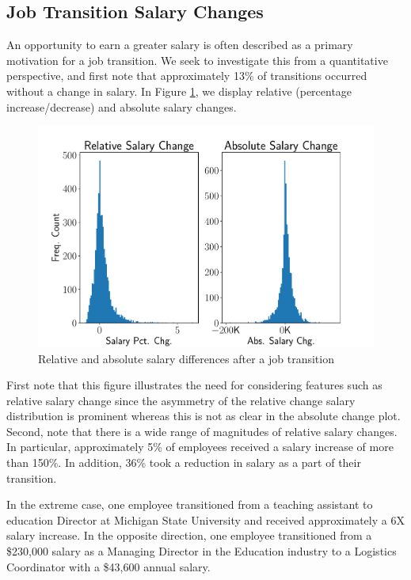 \documentclass[10pt]{article}
\begin{document}
\subsection{Job Transition Salary Changes}
\hspace{\parindent}
An opportunity to earn a greater salary is often described as a primary motivation 
for a job transition.  We seek to investigate this from a quantitative perspective, 
and first note that approximately 
13\% of transitions occurred without a change in salary. 
In Figure \ref{fig:salgr}, we display relative (percentage increase/decrease) and  
absolute salary changes. 
%
\begin{figure}[thb]
    \centering
    \includegraphics[width=1.0\linewidth]{salgr.pdf}
	\caption{Relative and absolute salary differences after a job transition}
	\label{fig:salgr}
\end{figure}
%
First note that this figure illustrates the need for considering 
features such as relative salary change since the asymmetry of the relative change salary distribution is 
prominent whereas this is not as clear in the absolute change plot.  
Second, note that there is a wide range of magnitudes of relative salary changes.  In particular, 
approximately 5\% of employees received a salary increase of more than 150\%.  In 
addition, 36\% took a reduction in salary as a part of their transition.  

In the extreme case, one employee transitioned from a teaching assistant to 
education Director at Michigan State University and received approximately a 6X 
salary increase.  In the opposite direction, one employee transitioned from a \$230,000 
salary as a Managing Director in the Education industry to a Logistics Coordinator 
with a \$43,600 annual salary. 
\end{document}
